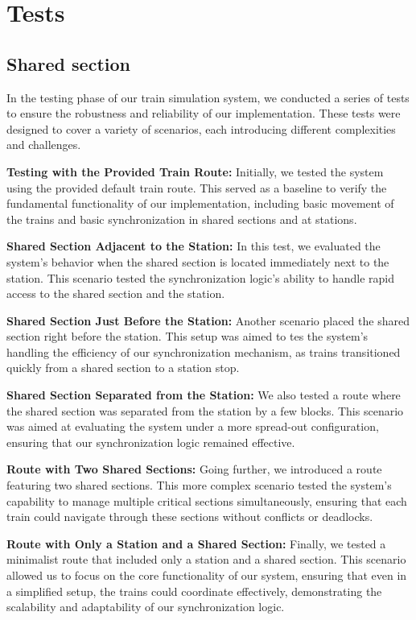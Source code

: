 \documentclass{article}
\begin{document}
    \newpage

    \section{Tests}
    \subsection*{Shared section}
    In the testing phase of our train simulation system, we conducted a series of tests to ensure the robustness and reliability of our implementation. These tests were designed to cover a variety of scenarios, each introducing different complexities and challenges.

    \textbf{Testing with the Provided Train Route:} Initially, we tested the system using the provided default train route. This served as a baseline to verify the fundamental functionality of our implementation, including basic movement of the trains and basic synchronization in shared sections and at stations.

    \textbf{Shared Section Adjacent to the Station:} In this test, we evaluated the system's behavior when the shared section is located immediately next to the station. This scenario tested the synchronization logic's ability to handle rapid access to the shared section and the station.

    \textbf{Shared Section Just Before the Station:} Another scenario placed the shared section right before the station. This setup was aimed to tes the system's handling the efficiency of our synchronization mechanism, as trains transitioned quickly from a shared section to a station stop.

    \textbf{Shared Section Separated from the Station:} We also tested a route where the shared section was separated from the station by a few blocks. This scenario was aimed at evaluating the system under a more spread-out configuration, ensuring that our synchronization logic remained effective.

    \textbf{Route with Two Shared Sections:} Going further, we introduced a route featuring two shared sections. This more complex scenario tested the system's capability to manage multiple critical sections simultaneously, ensuring that each train could navigate through these sections without conflicts or deadlocks.

    \textbf{Route with Only a Station and a Shared Section:} Finally, we tested a minimalist route that included only a station and a shared section. This scenario allowed us to focus on the core functionality of our system, ensuring that even in a simplified setup, the trains could coordinate effectively, demonstrating the scalability and adaptability of our synchronization logic.
\end{document}
